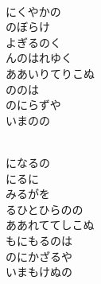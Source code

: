 \documentclass[10pt,b5j]{tarticle} %
\begin{document}
\begin{enumerate}
\begin{minipage}[c]{\blocksize}
    \end{minipage}
    \begin{minipage}[c]{\blocksize}
        
        \vspace{\linespace}
        \item~\\
        にくやかの\\
        のぼらけ\\
        よぎるのく\\
        んのはれゆく\\
        ああいりてりこぬ\\
        ののは\\
        のにらずや\\
        いまのの
        
    \end{minipage}
    \begin{minipage}[c]{\blocksize}
        
        \vspace{\linespace}
        \item~\\
        になるの\\
        にるに\\
        みるがを\\
        るひとひらのの\\
        ああれててしこぬ\\
        もにもるのは\\
        のにかざるや\\
        いまもけぬの
        
    \end{minipage}
    \begin{minipage}[c]{\blocksize}
        

\end{minipage}
\end{enumerate}
\end{document}
